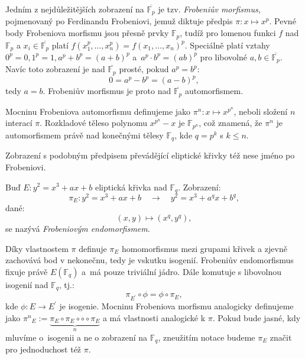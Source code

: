 \documentclass[12pt]{report}
\begin{document}
Jedním z nejdůležitějších zobrazení na $\overline{\mathbb{F}_p}$ je tzv. \textit{Frobeniův morfismus}, pojmenovaný po Ferdinandu Frobeniovi, jemuž diktuje předpis $\pi: x \mapsto x^p$. Pevné body Frobeniova morfismu jsou přesně prvky $\mathbb{F}_p$, tudíž pro lomenou funkci $f$ nad $\mathbb{F}_p$ a $x_i \in \overline{\mathbb{F}_p}$ platí $f(x_1^p,\dots,x_n^p)=f(x_1,\dots,x_n)^p$. Speciálně platí vztahy $0^p = 0, 1^p = 1, a^p + b^p = (a+b)^p$ a~$a^p \cdot b^p = (ab)^p$ pro libovolné $a,b \in \overline{\mathbb{F}_p}$. Navíc toto zobrazení je nad $\overline{\mathbb{F}_p}$ prosté, pokud $a^p = b^p$:
\begin{equation*}
0 = a^p - b^p =  (a-b)^p,
\end{equation*} tedy $a=b$. Frobeniův morfismus je proto nad $\overline{\mathbb{F}_p}$ automorfismem.

Mocninu Frobeniova automorfismu definujeme jako $\pi^n : x \mapsto x^{p^n}$, neboli složení $n$ interací $\pi$. Rozkladové těleso polynomu $x^{p^n}-x$ je $\mathbb{F}_{p^n}$, což znamená, že $\pi^n$ je automorfismem právě nad konečnými tělesy $\mathbb{F}_q$, kde $q =p^k$ s $k \leqslant n$. 

Zobrazení s podobným předpisem převádějící eliptické křivky též nese jméno po Frobeniovi.
\begin{definice}
Buď $E: y^2 = x^3+ax+b$ eliptická křivka nad $\mathbb{F}_q$. Zobrazení:
\begin{equation*}
\pi_E : y^2 = x^3+ax+b \quad \longrightarrow \quad y^2 = x^3 + a^q x + b^q,
\end{equation*}
dané:
\begin{equation*}
(x,y) \longmapsto (x^q,y^q),
\end{equation*}
se nazývá \textit{Frobeniovým endomorfismem}.
\end{definice}

Díky vlastnostem $\pi$ definuje $\pi_E$ homomorfismus mezi grupami křivek a zjevně zachovává bod v nekonečnu, tedy je vskutku isogenií. Frobeniův endomorfismus fixuje právě $E(\mathbb{F}_q)$ a~má pouze triviální jádro. Dále komutuje s libovolnou isogenií nad $\mathbb{F}_q$, tj.:
\begin{equation*}
\pi_{E^\prime} \circ \phi = \phi \circ \pi_E,
\end{equation*}
kde $\phi : E \longrightarrow E^\prime$ je isogenie. Mocninu Frobeniova morfismu analogicky definujeme jako ${\pi^n}_E := \underbrace{\pi_E \circ \pi_E \circ \circ \circ \pi_E}_{n}$ a má vlastnosti analogické k $\pi$. Pokud bude jasné, kdy mluvíme o~isogenii a ne o zobrazení na $\mathbb{F}_q$, zneužitím notace budeme $\pi_E$ značit pro jednoduchost též $\pi$.
\end{document}
